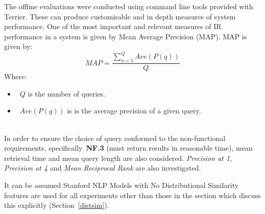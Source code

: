 \documentclass{l4proj}
\begin{document}
The offline evaluations were conducted using command line tools provided with Terrier. These can produce customisable and in depth measures of system performance.
One of the most important and relevant measures of IR performance in a system is given by Mean Average Precision (MAP).
MAP is given by:
\begin{displaymath}
  MAP=\frac{\sum_{n=1}^{Q} Ave(P(q))}{Q}
\end{displaymath}
Where: 
\begin{itemize}
\item{~$Q$ is the number of queries.}
\item{~$Ave(P(q))$ is is the average precision of a given query.}
\end{itemize}
\hfill \cite{Manning:2008:IIR:1394399}\\
In order to ensure the choice of query conformed to the non-functional requirements, specifically~\textbf{NF.3} (must return results in reasonable time), mean retrieval time and mean query length are also considered.
\textit{Precision at 1}, \textit{Precision at 4} and \textit{Mean Reciprocal Rank} are also investigated.

It can be assumed Stanford NLP Models with No Distributional Similarity features are used for all experiments other than those in the section which discuss this explicitly (Section~\ref{distsim}).
\end{document}

